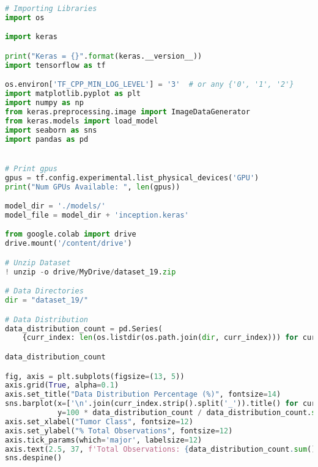\begin{lstlisting}[language=Python]
# Importing Libraries
import os

import keras

print("Keras = {}".format(keras.__version__))
import tensorflow as tf

os.environ['TF_CPP_MIN_LOG_LEVEL'] = '3'  # or any {'0', '1', '2'}
import matplotlib.pyplot as plt
import numpy as np
from keras.preprocessing.image import ImageDataGenerator
from keras.models import load_model
import seaborn as sns
import pandas as pd


# Print gpus
gpus = tf.config.experimental.list_physical_devices('GPU')
print("Num GPUs Available: ", len(gpus))

model_dir = './models/'
model_file = model_dir + 'inception.keras'

from google.colab import drive
drive.mount('/content/drive')

# Unzip Dataset
! unzip -o drive/MyDrive/dataset_19.zip

# Data Directories
dir = "dataset_19/"

# Data Distribution
data_distribution_count = pd.Series(
    {curr_index: len(os.listdir(os.path.join(dir, curr_index))) for curr_index in os.listdir(dir)})

data_distribution_count

fig, axis = plt.subplots(figsize=(13, 5))
axis.grid(True, alpha=0.1)
axis.set_title("Data Distribution Percentage (%)", fontsize=14)
sns.barplot(x=['\n'.join(curr_index.strip().split('_')).title() for curr_index in data_distribution_count.index],
            y=100 * data_distribution_count / data_distribution_count.sum(), ax=axis)
axis.set_xlabel("Tumor Class", fontsize=12)
axis.set_ylabel("% Total Observations", fontsize=12)
axis.tick_params(which='major', labelsize=12)
axis.text(2.5, 37, f'Total Observations: {data_distribution_count.sum()}', fontdict=dict(size=12))
sns.despine()

\end{lstlisting}
